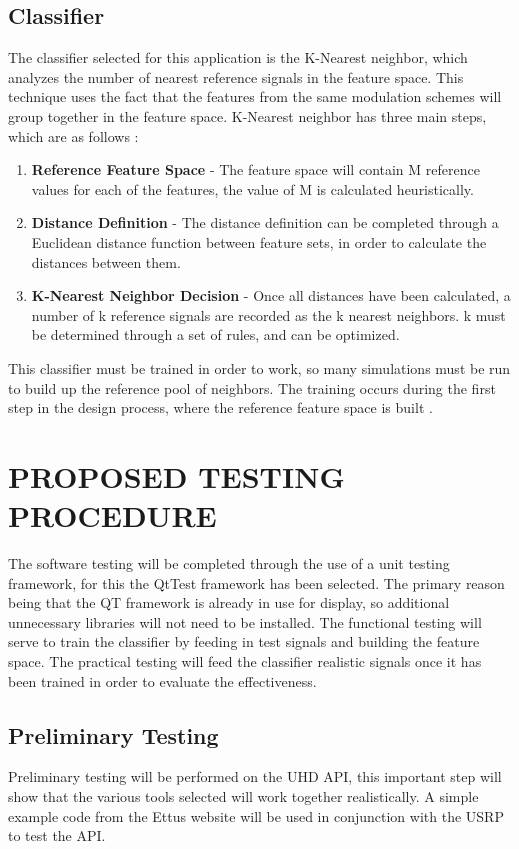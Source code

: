 \documentclass[10pt,twocolumn]{witseiepaper}
\begin{document}
	\subsection{Classifier}
	\label{subsec:classifier}
	The classifier selected for this application is the K-Nearest neighbor, which analyzes the number of nearest reference signals in the feature space. This technique uses the fact that the features from the same modulation schemes will group together in the feature space. K-Nearest neighbor has three main steps, which are as follows \cite{zhu2014automatic}:
	\begin{enumerate}
		\item \textbf{Reference Feature Space} - The feature space will contain M reference values for each of the features, the value of M is calculated heuristically. 
		\item \textbf{Distance Definition} - The distance definition can be completed through a Euclidean distance function between feature sets, in order to calculate the distances between them.
		\item \textbf{K-Nearest Neighbor Decision} - Once all distances have been calculated, a number of k reference signals are recorded as the k nearest neighbors. k must be determined through a set of rules, and can be optimized.
	\end{enumerate}
	This classifier must be trained in order to work, so many simulations must be run to build up the reference pool of neighbors. The training occurs during the first step in the design process, where the reference feature space is built \cite{zhu2014automatic}.

\section{PROPOSED TESTING PROCEDURE}
	The software testing will be completed through the use of a unit testing framework, for this the QtTest framework has been selected. The primary reason being that the QT framework is already in use for display, so additional unnecessary libraries will not need to be installed. The functional testing will serve to train the classifier by feeding in test signals and building the feature space. The practical testing will feed the classifier realistic signals once it has been trained in order to evaluate the effectiveness.
	\subsection{Preliminary Testing}
		Preliminary testing will be performed on the UHD API, this important step will show that the various tools selected will work together realistically. A simple example code from the Ettus website \cite{uhd_tutorial} will be used in conjunction with the USRP to test the API.
\end{document}
